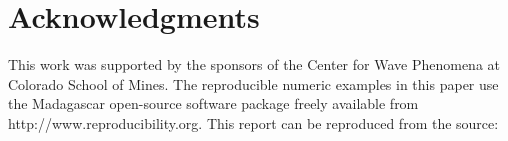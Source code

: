 \section{Acknowledgments}
This work was supported by the sponsors of the Center for Wave Phenomena at Colorado School of Mines.
%
The reproducible numeric examples in this paper use the Madagascar open-source software package 
freely available from http://www.reproducibility.org.
%
This report can be reproduced from the source: 
